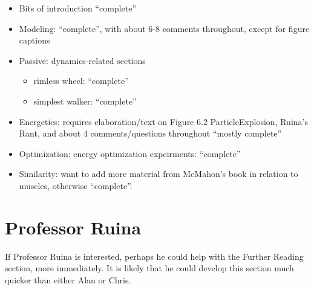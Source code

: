 \begin{itemize}
\item Bits of introduction ``complete''
\item Modeling: ``complete'', with about 6-8 comments throughout, except for figure captions
\item Passive: dynamics-related sections

\begin{itemize}
\item rimless wheel: ``complete''
\item simplest walker: ``complete''
\end{itemize}

\item Energetics: requires elaboration/text on Figure 6.2 ParticleExplosion, Ruina's Rant, and about 4 comments/questions throughout ``mostly complete''
\item Optimization: energy optimization expeirments: ``complete''
\item Similarity: want to add more material from McMahon's book in relation to muscles, otherwise ``complete''.
\end{itemize}

\section*{Professor Ruina}

If Professor Ruina is interested, perhaps he could help with the Further Reading section, more immediately. It is likely that he could develop this section much quicker than either Alan or Chris.